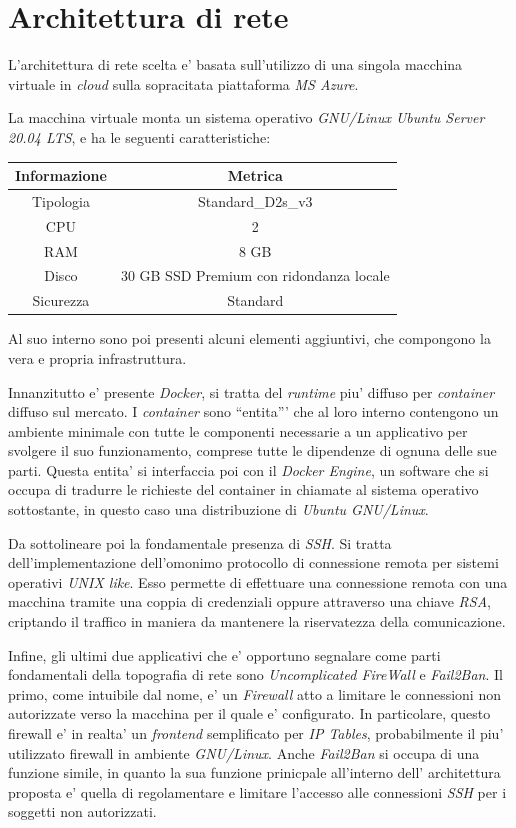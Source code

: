 \documentclass[a4paper]{report}
\newcommand{\quotes}[1]{``#1''}
\begin{document}
	\section{Architettura di rete}\label{architettura_di_rete}%
		L'architettura di rete scelta e' basata sull'utilizzo di una singola macchina virtuale in \emph{cloud} sulla
		sopracitata piattaforma \emph{MS Azure}.

		La macchina virtuale monta un sistema operativo \emph{GNU/Linux Ubuntu Server 20.04 LTS}, e ha le seguenti
		caratteristiche:
		\begin{center}
			\begin{tabular}{c c}
				Informazione & Metrica \\
				\midrule
				Tipologia & Standard\_D2s\_v3 \\
				CPU & 2 \\
				RAM & 8 GB \\
				Disco & 30 GB SSD Premium con ridondanza locale \\
				Sicurezza & Standard \\
			\end{tabular}
		\end{center}

		Al suo interno sono poi presenti alcuni elementi aggiuntivi, che compongono la vera e propria infrastruttura.

		Innanzitutto e' presente \emph{Docker}, si tratta del \emph{runtime} piu' diffuso per \emph{container} diffuso
		sul mercato. I \emph{container} sono \quotes{entita'} che al loro interno contengono un ambiente minimale con
		tutte le componenti necessarie a un applicativo per svolgere il suo funzionamento, comprese tutte le dipendenze
		di ognuna delle sue parti. Questa entita' si interfaccia poi con il \emph{Docker Engine}, un software che si
		occupa di tradurre le richieste del container in chiamate al sistema operativo sottostante, in questo caso una
		distribuzione di \emph{Ubuntu GNU/Linux}.

		Da sottolineare poi la fondamentale presenza di \emph{SSH}\label{SSH}. Si tratta dell'implementazione
		dell'omonimo protocollo di connessione remota per sistemi operativi \emph{UNIX like}. Esso permette di
		effettuare una connessione remota con una macchina tramite una coppia di credenziali oppure attraverso una chiave
		\emph{RSA}, criptando il traffico in maniera da mantenere la riservatezza della comunicazione.

		Infine, gli ultimi due applicativi che e' opportuno segnalare come parti fondamentali della topografia di rete
		sono \emph{Uncomplicated FireWall} e \emph{Fail2Ban}. Il primo, come intuibile dal nome, e' un \emph{Firewall}
		atto a limitare le connessioni non autorizzate verso la macchina per il quale e' configurato. In particolare,
		questo firewall e' in realta' un \emph{frontend} semplificato per \emph{IP Tables}, probabilmente il piu'
		utilizzato firewall in ambiente \emph{GNU/Linux}.
		Anche \emph{Fail2Ban} si occupa di una funzione simile, in quanto la sua funzione prinicpale all'interno dell'
		architettura proposta e' quella di regolamentare e limitare l'accesso alle connessioni \emph{SSH} per i soggetti
		non autorizzati.
\end{document}
